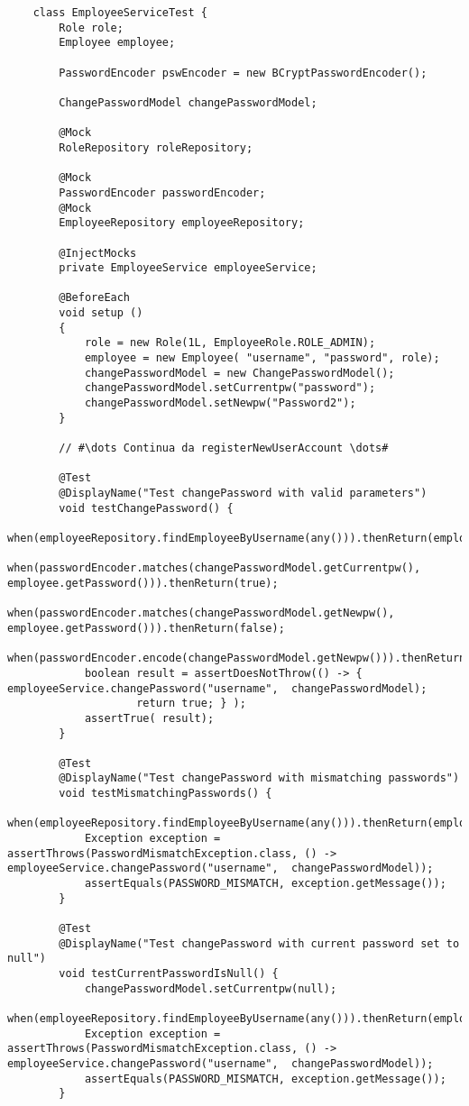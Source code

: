 \label{elsrc:EmployeeServiceTestchangePassword}
\begin{verbatim}
	class EmployeeServiceTest {
		Role role;
		Employee employee;

		PasswordEncoder pswEncoder = new BCryptPasswordEncoder();

		ChangePasswordModel changePasswordModel;

		@Mock
		RoleRepository roleRepository;

		@Mock
		PasswordEncoder passwordEncoder;
		@Mock
		EmployeeRepository employeeRepository;

		@InjectMocks
		private EmployeeService employeeService;

		@BeforeEach
		void setup ()
		{
			role = new Role(1L, EmployeeRole.ROLE_ADMIN);
			employee = new Employee( "username", "password", role);
			changePasswordModel = new ChangePasswordModel();
			changePasswordModel.setCurrentpw("password");
			changePasswordModel.setNewpw("Password2");
		}

		// #\dots Continua da registerNewUserAccount \dots#

		@Test
		@DisplayName("Test changePassword with valid parameters")
		void testChangePassword() {
			when(employeeRepository.findEmployeeByUsername(any())).thenReturn(employee);
			when(passwordEncoder.matches(changePasswordModel.getCurrentpw(), employee.getPassword())).thenReturn(true);
			when(passwordEncoder.matches(changePasswordModel.getNewpw(), employee.getPassword())).thenReturn(false);
			when(passwordEncoder.encode(changePasswordModel.getNewpw())).thenReturn((pswEncoder.encode(changePasswordModel.getNewpw())));
			boolean result = assertDoesNotThrow(() -> { 		employeeService.changePassword("username",  changePasswordModel);
					return true; } );
			assertTrue( result);
		}

		@Test
		@DisplayName("Test changePassword with mismatching passwords")
		void testMismatchingPasswords() {
			when(employeeRepository.findEmployeeByUsername(any())).thenReturn(employee);
			Exception exception = assertThrows(PasswordMismatchException.class, () -> employeeService.changePassword("username",  changePasswordModel));
			assertEquals(PASSWORD_MISMATCH, exception.getMessage());
		}

		@Test
		@DisplayName("Test changePassword with current password set to null")
		void testCurrentPasswordIsNull() {
			changePasswordModel.setCurrentpw(null);
			when(employeeRepository.findEmployeeByUsername(any())).thenReturn(employee);
			Exception exception = assertThrows(PasswordMismatchException.class, () -> employeeService.changePassword("username",  changePasswordModel));
			assertEquals(PASSWORD_MISMATCH, exception.getMessage());
		}


\end{verbatim}
